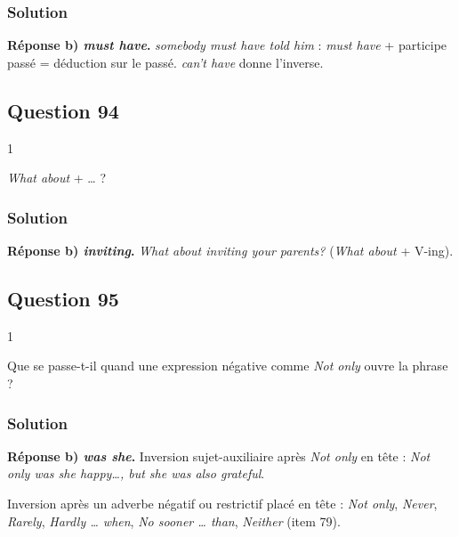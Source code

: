 \documentclass[11pt,a4paper]{article}
\begin{document}
\hypertarget{solution-92}{%
\subsubsection{Solution}\label{solution-92}}

\textbf{Réponse b) \emph{must have}.} \emph{somebody must have told him} : \emph{must have} + participe passé = déduction sur le passé. \emph{can't have} donne l'inverse.

\hypertarget{question-94}{%
\subsection{Question 94}\label{question-94}}

\begin{indication}{1}

\emph{What about} + \ldots{} ?

\end{indication}

\hypertarget{solution-93}{%
\subsubsection{Solution}\label{solution-93}}

\textbf{Réponse b) \emph{inviting}.} \emph{What about inviting your parents?} (\emph{What about} + V-ing).

\hypertarget{question-95}{%
\subsection{Question 95}\label{question-95}}

\begin{indication}{1}

Que se passe-t-il quand une expression négative comme \emph{Not only} ouvre la phrase ?

\end{indication}

\hypertarget{solution-94}{%
\subsubsection{Solution}\label{solution-94}}

\textbf{Réponse b) \emph{was she}.} Inversion sujet-auxiliaire après \emph{Not only} en tête : \emph{Not only was she happy\ldots, but she was also grateful}.

\begin{methode}

Inversion après un adverbe négatif ou restrictif placé en tête : \emph{Not only}, \emph{Never}, \emph{Rarely}, \emph{Hardly \ldots{} when}, \emph{No sooner \ldots{} than}, \emph{Neither} (item 79).

\end{methode}
\end{document}
